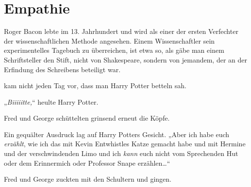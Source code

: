 \chapter{Empathie}

\begin{chapterOpeningAuthorNote}
% 
Roger Bacon lebte im 13. Jahrhundert und wird als einer der ersten Verfechter der wissenschaftlichen Methode angesehen. Einem Wissenschaftler sein experimentelles Tagebuch zu überreichen, ist etwa so, als gäbe man einem Schriftsteller den Stift, nicht von Shakespeare, sondern von jemandem, der an der Erfindung des Schreibens beteiligt war.
\end{chapterOpeningAuthorNote}

 kam nicht jeden Tag vor, dass man Harry Potter betteln sah.

\hplettrineextrapara
„\emph{Biiiiitte,}“ heulte Harry Potter.

Fred und George schüttelten grinsend erneut die Köpfe.

Ein gequälter Ausdruck lag auf Harry Potters Gesicht. „Aber ich habe euch \emph{erzählt}, wie ich das mit Kevin Entwhistles Katze gemacht habe und mit Hermine und der verschwindenden Limo und ich \emph{kann} euch nicht vom Sprechenden Hut oder dem Erinnermich oder Professor Snape erzählen…“

Fred und George zuckten mit den Schultern und gingen.


